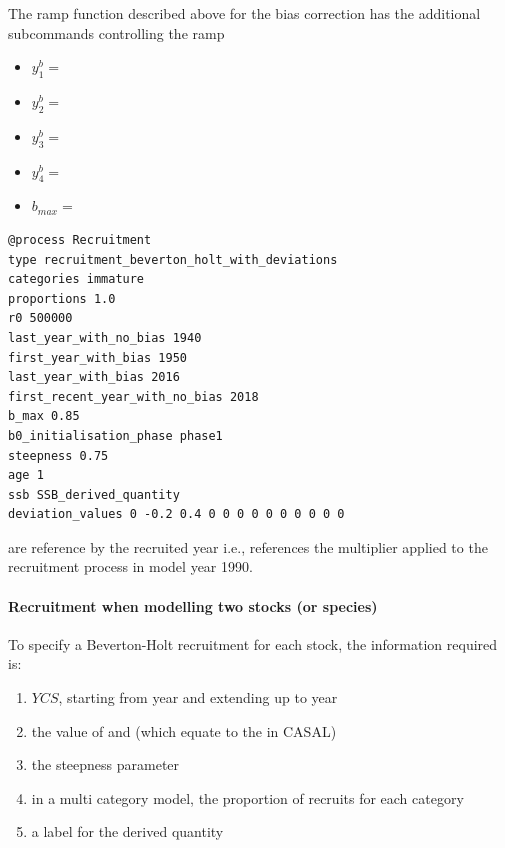 The ramp function described above for the bias correction has the additional subcommands controlling the ramp

\begin{itemize}
	\item $y_1^b = $ 
	\item $y_2^b = $ 
	\item $y_3^b = $ 
	\item $y_4^b = $ 
	\item $b_{max} = $ 
\end{itemize}

{\small{\begin{verbatim}
@process Recruitment
type recruitment_beverton_holt_with_deviations
categories immature
proportions 1.0
r0 500000
last_year_with_no_bias 1940
first_year_with_bias 1950
last_year_with_bias 2016
first_recent_year_with_no_bias 2018
b_max 0.85
b0_initialisation_phase phase1
steepness 0.75
age 1
ssb SSB_derived_quantity
deviation_values 0 -0.2 0.4 0 0 0 0 0 0 0 0 0 0
\end{verbatim}}}

 are reference by the recruited year i.e.,  references the multiplier applied to the recruitment process in model year 1990.

\paragraph*{Recruitment when modelling two stocks (or species)}

To specify a Beverton-Holt recruitment for each stock, the information required is:

\begin{enumerate}
	\item $YCS$, starting from year  and extending up to year 
	\item the value of  and  (which equate to the  in CASAL)
	\item the steepness parameter 
	\item in a multi category model, the proportion of recruits for each category
	\item a label for the derived quantity
\end{enumerate}


